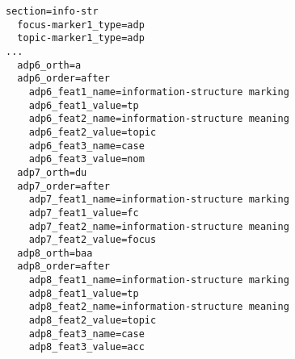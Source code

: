 \documentclass[a4paper]{article}
\begin{document}
{\small\begin{verbatim}
section=info-str
  focus-marker1_type=adp
  topic-marker1_type=adp
...
  adp6_orth=a
  adp6_order=after
    adp6_feat1_name=information-structure marking
    adp6_feat1_value=tp
    adp6_feat2_name=information-structure meaning
    adp6_feat2_value=topic
    adp6_feat3_name=case
    adp6_feat3_value=nom
  adp7_orth=du
  adp7_order=after
    adp7_feat1_name=information-structure marking
    adp7_feat1_value=fc
    adp7_feat2_name=information-structure meaning
    adp7_feat2_value=focus
  adp8_orth=baa
  adp8_order=after
    adp8_feat1_name=information-structure marking
    adp8_feat1_value=tp
    adp8_feat2_name=information-structure meaning
    adp8_feat2_value=topic
    adp8_feat3_name=case
    adp8_feat3_value=acc
\end{verbatim}}
\end{document}
